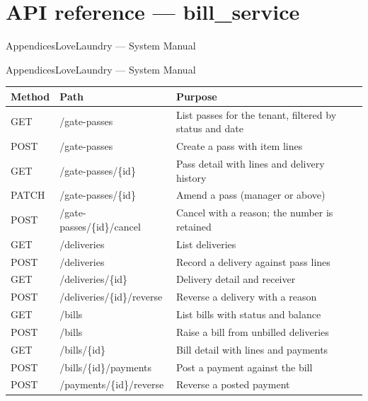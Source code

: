 \documentclass[11pt,a4paper,oneside]{book}
\begin{document}
\section*{API reference — bill\_service}
AppendicesLoveLaundry — System Manual

AppendicesLoveLaundry — System Manual

\begin{center}\small
\begin{tabularx}{\linewidth}{|X|X|X|}
\hline
\rowcolor{lightgrey}
\textbf{Method} & \textbf{Path} & \textbf{Purpose} \\ \hline
GET & /gate-passes & List passes for the tenant, filtered by status and date \\ \hline
POST & /gate-passes & Create a pass with item lines \\ \hline
GET & /gate-passes/\{id\} & Pass detail with lines and delivery history \\ \hline
PATCH & /gate-passes/\{id\} & Amend a pass (manager or above) \\ \hline
POST & /gate-passes/\{id\}/cancel & Cancel with a reason; the number is retained \\ \hline
GET & /deliveries & List deliveries \\ \hline
POST & /deliveries & Record a delivery against pass lines \\ \hline
GET & /deliveries/\{id\} & Delivery detail and receiver \\ \hline
POST & /deliveries/\{id\}/reverse & Reverse a delivery with a reason \\ \hline
GET & /bills & List bills with status and balance \\ \hline
POST & /bills & Raise a bill from unbilled deliveries \\ \hline
GET & /bills/\{id\} & Bill detail with lines and payments \\ \hline
POST & /bills/\{id\}/payments & Post a payment against the bill \\ \hline
POST & /payments/\{id\}/reverse & Reverse a posted payment \\ \hline
\end{tabularx}
\end{center}
\end{document}
